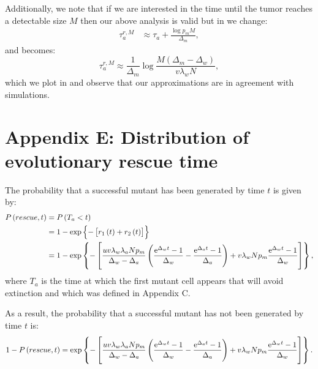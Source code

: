 \documentclass[12pt]{extarticle}
\newcommand{\e}{{\rm e}}
\begin{document}
\begin{appendices}
Additionally, we note that if we are interested in the time until the tumor reaches a detectable size $M$ then our above analysis is valid but in  we change:
\begin{align}\label{meanproliferationtime2}
\tau_a^{r,M}&\approx\tau_a+\frac{\log p_mM}{\Delta_m},
\end{align}
and  becomes:
\begin{equation}\label{eq:t2det2}
\tau_a^{r,M}\approx\frac{1}{\Delta_m}\log\frac{M\left(\Delta_m-\Delta_w\right)}{v\lambda_wN},
\end{equation}
which we plot in  and observe that our approximations are in agreement with simulations.

\section*{Appendix E: Distribution of evolutionary rescue time}
The probability that a successful mutant has been generated by time $t$ is given by:
\begin{align*}
P\left(rescue,t\right)&=P\left(T_a<t\right)\\
&=1-\exp\left\{-\left[r_1\left(t\right)+r_2\left(t\right)\right]\right\}\\
&=1-\exp\left\{-\left[\frac{uv\lambda_w\lambda_aNp_m}{\Delta_w-\Delta_a}\left(\frac{\e^{\Delta_wt}-1}{\Delta_w}-\frac{\e^{\Delta_at}-1}{\Delta_a}\right)+ v\lambda_wNp_m\frac{\e^{\Delta_w t}-1}{\Delta_w}\right]\right\},
\end{align*}
where $T_a$ is the time at which the first mutant cell appears that will avoid extinction and which was defined in Appendix C.

As a result, the probability that a successful mutant has not been generated by time $t$ is:
\begin{equation}
1-P\left(rescue,t\right)=\exp\left\{-\left[\frac{uv\lambda_w\lambda_aNp_m}{\Delta_w-\Delta_a}\left(\frac{\e^{\Delta_wt}-1}{\Delta_w}-\frac{\e^{\Delta_at}-1}{\Delta_a}\right)+ v\lambda_wNp_m\frac{\e^{\Delta_w t}-1}{\Delta_w}\right]\right\}.
\end{equation}

\end{appendices}
\end{document}
